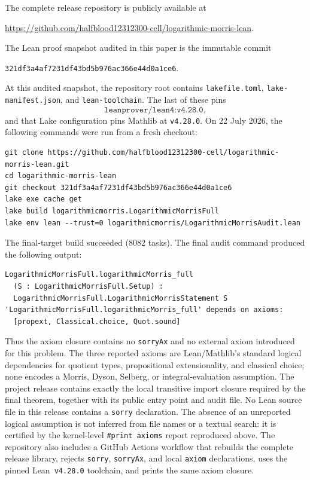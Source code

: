 \documentclass[11pt,a4paper]{article}
\theoremstyle{definition}
\begin{document}
The complete release repository is publicly available at
\begin{center}
\url{https://github.com/halfblood12312300-cell/logarithmic-morris-lean}.
\end{center}
The Lean proof snapshot audited in this paper is the immutable commit
\begin{center}
\texttt{321df3a4af7231df43bd5b976ac366e44d0a1ce6}.
\end{center}
At this audited snapshot, the repository root contains \texttt{lakefile.toml},
\texttt{lake-manifest.json}, and \texttt{lean-toolchain}.  The last of
these pins
\[
\texttt{leanprover/lean4:v4.28.0},
\]
and that Lake configuration pins Mathlib at \texttt{v4.28.0}.  On
22 July 2026, the following commands were run from a fresh checkout:
\begin{verbatim}
git clone https://github.com/halfblood12312300-cell/logarithmic-morris-lean.git
cd logarithmic-morris-lean
git checkout 321df3a4af7231df43bd5b976ac366e44d0a1ce6
lake exe cache get
lake build logarithmicmorris.LogarithmicMorrisFull
lake env lean --trust=0 logarithmicmorris/LogarithmicMorrisAudit.lean
\end{verbatim}
The final-target build succeeded (8082 tasks).  The final audit command
produced
the following output:
\begin{verbatim}
LogarithmicMorrisFull.logarithmicMorris_full
  (S : LogarithmicMorrisFull.Setup) :
  LogarithmicMorrisFull.LogarithmicMorrisStatement S
'LogarithmicMorrisFull.logarithmicMorris_full' depends on axioms:
  [propext, Classical.choice, Quot.sound]
\end{verbatim}
Thus the axiom closure contains no \texttt{sorryAx} and no external
axiom introduced for this problem.  The three reported axioms are
Lean/Mathlib's standard logical dependencies for quotient types,
propositional extensionality, and classical choice; none encodes a
Morris, Dyson, Selberg, or integral-evaluation assumption.  The project
release contains exactly the local transitive import closure required by
the final theorem, together with its public entry point and audit file.
No Lean source file in this release contains a \texttt{sorry}
declaration.  The absence of an unreported logical assumption is not
inferred from file names or a textual search: it is certified by the
kernel-level \texttt{\#print axioms} report reproduced above.  The
repository also includes a GitHub Actions workflow that rebuilds the
complete release library, rejects \texttt{sorry}, \texttt{sorryAx}, and
local \texttt{axiom} declarations, uses the pinned Lean~\texttt{v4.28.0}
toolchain, and prints the same axiom closure.
\end{document}
